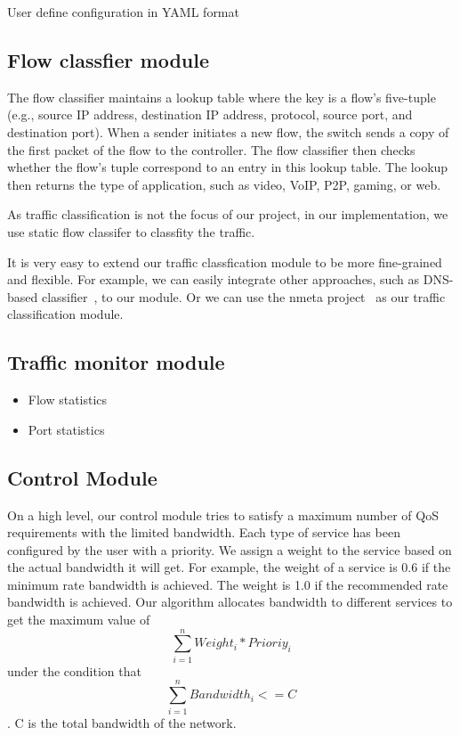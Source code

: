 User define configuration in YAML format
\subsection{Flow classfier module}
The flow classifier maintains a lookup table where the key is a flow’s five-tuple (e.g., source IP address, destination IP address, protocol, source port, and destination port). When a
sender initiates a new flow, the switch sends a copy of the first packet of the flow to the controller. The flow classifier then checks whether the flow’s tuple correspond to an entry in this lookup table. The lookup then returns the type of application, such as video, VoIP, P2P, gaming, or web.

As traffic classification is not the focus of our project, in our implementation, we use static flow classifer to classfity the traffic.

It is very easy to extend our traffic classfication module to be more fine-grained and flexible. For example, we can easily integrate other approaches, such as DNS-based classifier~\cite{Seddiki_HotSDN14}, to our module. Or we can use the nmeta project~\cite{nmeta} as our traffic classification module.

\subsection{Traffic monitor module}



\begin{itemize}
\item Flow statistics
\item Port statistics
\end{itemize}
\subsection{Control Module}
On a high level, our control module tries to satisfy a maximum number of QoS requirements with the limited bandwidth.
Each type of service has been configured by the user with a priority. We assign a weight to the service based on the actual bandwidth it will get. For example, the weight of a service is 0.6 if the minimum rate bandwidth is achieved. The weight is 1.0 if the recommended rate bandwidth is achieved.
Our algorithm allocates bandwidth to different services to get the maximum value of $$\sum_{i=1}^{n} Weight_i*Prioriy_i $$ under the condition that
$$\sum_{i=1}^{n} Bandwidth_i <= C $$. C is the total bandwidth of the network.


